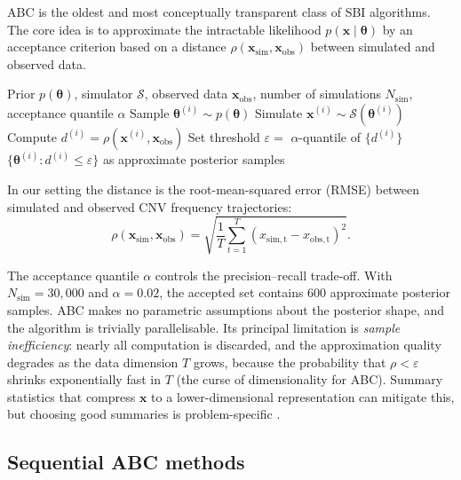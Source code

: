 \documentclass[11pt]{article}
\newcommand{\btheta}{\boldsymbol{\theta}}
\newcommand{\bx}{\mathbf{x}}
\begin{document}
ABC \citep{tavare1997inferring,pritchard1999population} is the oldest and most
conceptually transparent class of SBI algorithms.
The core idea is to approximate the intractable likelihood
$p(\bx\mid\btheta)$ by an acceptance criterion based on a distance
$\rho(\bx_\mathrm{sim}, \bx_\mathrm{obs})$ between simulated and observed data.

\begin{algorithm}[ht]
\caption{Rejection ABC}
\begin{algorithmic}[1]
  \Require Prior $p(\btheta)$, simulator $\mathcal{S}$, observed data
           $\bx_\mathrm{obs}$, number of simulations $N_\mathrm{sim}$,
           acceptance quantile $\alpha$
    \State Sample $\btheta^{(i)} \sim p(\btheta)$
    \State Simulate $\bx^{(i)} \sim \mathcal{S}(\btheta^{(i)})$
    \State Compute $d^{(i)} = \rho(\bx^{(i)}, \bx_\mathrm{obs})$
  \EndFor
  \State Set threshold $\varepsilon = $ $\alpha$-quantile of $\{d^{(i)}\}$
  \State \Return $\{\btheta^{(i)} : d^{(i)} \le \varepsilon\}$ as
         approximate posterior samples
\end{algorithmic}
\label{alg:abc}
\end{algorithm}

In our setting the distance is the root-mean-squared error (RMSE) between
simulated and observed CNV frequency trajectories:
\begin{equation}
  \rho(\bx_\mathrm{sim}, \bx_\mathrm{obs})
  = \sqrt{\frac{1}{T}\sum_{t=1}^{T}(x_\mathrm{sim,t} - x_\mathrm{obs,t})^2}.
  \label{eq:rmse}
\end{equation}

The acceptance quantile $\alpha$ controls the precision--recall trade-off.
With $N_\mathrm{sim} = 30{,}000$ and $\alpha = 0.02$, the accepted set
contains 600 approximate posterior samples.
ABC makes no parametric assumptions about the posterior shape, and the
algorithm is trivially parallelisable.
Its principal limitation is \emph{sample inefficiency}: nearly all computation
is discarded, and the approximation quality degrades as the data dimension $T$
grows, because the probability that $\rho < \varepsilon$ shrinks exponentially
fast in $T$ (the curse of dimensionality for ABC).
Summary statistics that compress $\bx$ to a lower-dimensional representation
can mitigate this, but choosing good summaries is problem-specific
\citep{beaumont2002approximate}.

\subsection{Sequential ABC methods}
\label{sec:seq_abc}
\end{document}
